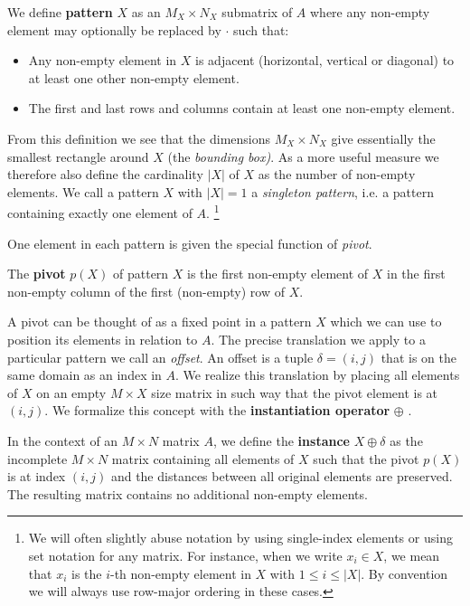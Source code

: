 \documentclass{llncs}
\begin{document}
\begin{definition}
We define \textbf{pattern} $X$ as an $M_X\times N_X$ submatrix of $A$ where any non-empty element may optionally be replaced by $\cdot$ such that:
\begin{itemize}
\item Any non-empty element in $X$ is adjacent (horizontal, vertical or diagonal) to at least one other non-empty element.
\item The first and last rows and columns contain at least one non-empty element.
\end{itemize}
\end{definition}

From this definition we see that the dimensions $M_X\times N_X$ give essentially the smallest rectangle around $X$ (the \emph{bounding box)}. As a more useful measure we therefore also define the cardinality $|X|$ of $X$ as the number of non-empty elements. We call a pattern $X$ with $|X|=1$ a \emph{singleton pattern}, i.e. a pattern containing exactly one element of $A$. \footnote{We will often slightly abuse notation by using single-index elements or using set notation for any matrix. For instance, when we write $x_i \in X$, we mean that $x_i$ is the $i$-th non-empty element in $X$ with $1\leq i \leq |X|$. By convention we will always use row-major ordering in these cases.}

One element in each pattern is given the special function of \emph{pivot}. 

\begin{definition}
The \textbf{pivot} $p(X)$ of pattern $X$ is the first non-empty element of $X$ in the first non-empty column of the first (non-empty) row of $X$.
\end{definition}

A pivot can be thought of as a fixed point in a pattern $X$ which we can use to position its elements in relation to $A$. The precise translation we apply to a particular pattern we call an \emph{offset}. An offset is a tuple $\delta=(i,j)$ that is on the same domain as an index in $A$. We realize this translation by placing all elements of $X$ on an empty $M\times X$ size matrix in such way that the pivot element is at $(i,j)$. We formalize this concept with the \textbf{instantiation operator} $\oplus$ .

\begin{definition}
In the context of an $M\times N$ matrix $A$, we define the \textbf{instance} $X \oplus \delta$ as the incomplete $M\times N$ matrix containing all elements of $X$ such that the pivot $p(X)$ is at index $(i,j)$ and the distances between all original elements are preserved. The resulting matrix contains no additional non-empty elements. 
\end{definition}
\end{document}
